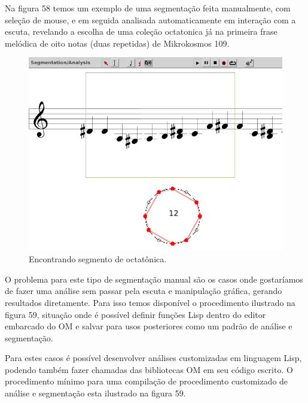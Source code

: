 \documentclass[
	12pt,				%
	openright,			%
	twoside,			%
	a4paper,			%
	english,			%
	french,				%
	spanish,			%
	brazil				%
	]{abntex2}
\begin{document}
Na figura 58 temos um exemplo de uma segmentação feita manualmente, com seleção de mouse, e em seguida analisada automaticamente em interação com a escuta, revelando a escolha de uma coleção octatonica já na primeira frase melódica de oito notas (duas repetidas) de Mikrokosmos 109.


\begin{figure}[!h]
	\caption{\label{fig_grafico}Encontrando segmento de octatônica. }
	\begin{center}
	    \includegraphics[scale=0.3]{OM_settheory/SegmentaMikro109Octa.png}
	\end{center}
\end{figure}	

O problema para este tipo de segmentação manual são os casos onde gostaríamos de fazer uma análise sem passar pela escuta e manipulação gráfica, gerando resultados diretamente. Para isso temos disponível o procedimento ilustrado na figura 59, situação onde é possível definir funções Lisp dentro do editor embarcado do OM e salvar para usos posteriores como um padrão de análise e segmentação.

Para estes casos é possível desenvolver análises customizadas em linguagem Lisp, podendo também fazer chamadas das bibliotecas OM em seu código escrito. O procedimento mínimo para uma compilação de procedimento customizado de análise e segmentação esta ilustrado na figura 59.
\end{document}
